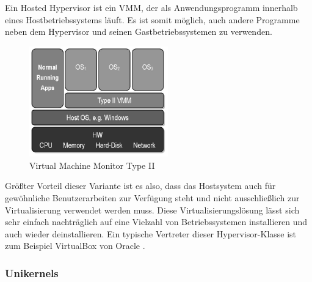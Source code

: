 Ein Hosted Hypervisor ist ein \ac{VMM}, der als Anwendungsprogramm innerhalb eines Hostbetriebssystems läuft. Es ist somit möglich, auch andere Programme neben dem Hypervisor und seinen Gastbetriebssystemen zu verwenden.

\begin{figure}[!ht]
  \begin{center}
    \includegraphics[width=6cm]{bilder/VMM-Type2.jpg}
    \caption{Virtual Machine Monitor Type II \citep{wiki:003}}
  \end{center}
\end{figure}

Größter Vorteil dieser Variante ist es also, dass das Hostsystem auch für gewöhnliche Benutzerarbeiten zur Verfügung steht und nicht ausschließlich zur Virtualisierung verwendet werden muss. Diese Virtualisierungslösung lässt sich sehr einfach nachträglich auf eine Vielzahl von Betriebssystemen installieren und auch wieder deinstallieren. Ein typische Vertreter dieser Hypervisor-Klasse ist zum Beispiel VirtualBox von Oracle \citep{wiki:004}.

\subsubsection{Unikernels}

